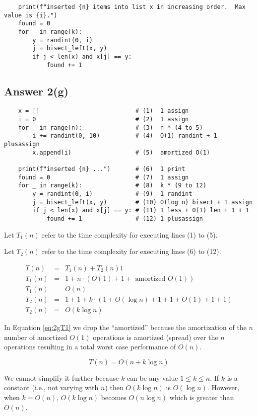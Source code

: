 \documentclass{article}
\begin{document}
\begin{enumerate}[label=(\alph*)]
\begin{verbatim}
    print(f"inserted {n} items into list x in increasing order.  Max value is {i}.")
    found = 0
    for _ in range(k):
        y = randint(0, i)
        j = bisect_left(x, y)
        if j < len(x) and x[j] == y:
            found += 1
\end{verbatim}

\subsection{Answer 2(g)}

\begin{verbatim}
    x = []                           # (1)  1 assign
    i = 0                            # (2)  1 assign
    for _ in range(n):               # (3)  n * (4 to 5)
        i += randint(0, 10)          # (4)  O(1) randint + 1 plusassign
        x.append(i)                  # (5)  amortized O(1)
                                     
    print(f"inserted {n} ...")       # (6)  1 print
    found = 0                        # (7)  1 assign
    for _ in range(k):               # (8)  k * (9 to 12)
        y = randint(0, i)            # (9)  1 randint
        j = bisect_left(x, y)        # (10) O(log n) bisect + 1 assign
        if j < len(x) and x[j] == y: # (11) 1 less + O(1) len + 1 + 1
            found += 1               # (12) 1 plusassign
\end{verbatim}

Let $T_1(n)$ refer to the time complexity for executing lines (1) to (5).

Let $T_2(n)$ refer to the time complexity for executing lines (6) to (12).

\begin{eqnarray*}
  T(n) &=& T_1(n) + T_2(n)1 \\
  T_1(n) &=& 1 + n \cdot ( O(1) + 1 + \text{ amortized } O(1)) \\
  T_1(n) &=& O(n) \label{eq:2gT1} \\
  T_2(n) &=& 1 + 1 + k \cdot (1 + O(\log n) + 1 + 1 + O(1) + 1 + 1) \\
  T_2(n) &=& O(k \log n) 
\end{eqnarray*}

In Equation \ref{eq:2gT1} we drop the ``amortized'' because the
amortization of the $n$ number of amortized $O(1)$ operations is
amortized (spread) over the $n$ operations resulting in a total worst
case performance of $O(n)$.

\begin{equation*}
  \boxed{T(n) = O(n + k \log n)}
\end{equation*}

We cannot simplify it further because $k$ can be any value $1 \leq k
\leq n$.  If $k$ is a constant (i.e., not varying with $n$) then
$O(k\log n)$ is $O(\log n)$. However, when $k=O(n)$, $O(k \log n)$
becomes $O(n \log n)$ which is greater than $O(n)$.

\end{enumerate}
\end{document}
